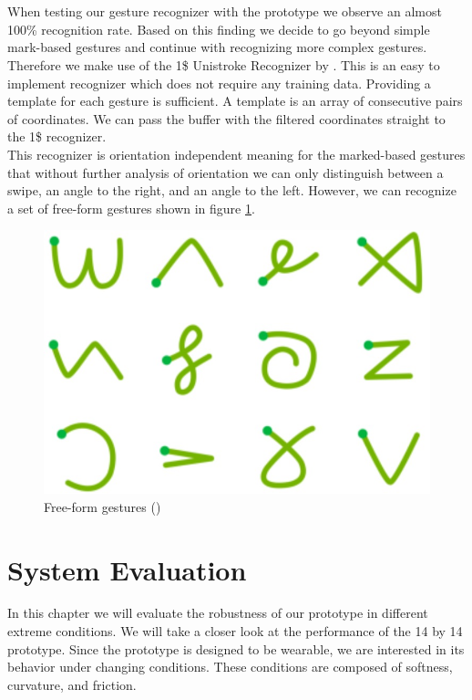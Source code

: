 \\ \\
When testing our gesture recognizer with the prototype we observe an almost 100\% recognition rate. Based on this finding we decide to go beyond simple mark-based gestures and continue with recognizing  more complex gestures. Therefore we make use of the 1\$ Unistroke Recognizer by \cite{Wobbrock}. This is an easy to implement recognizer which does not require any training data. Providing a template for each gesture is sufficient. A template is an array of consecutive pairs of coordinates. We can pass the buffer with the filtered coordinates straight to the 1\$ recognizer.
\\
This recognizer is orientation independent meaning for the marked-based gestures that without further analysis of orientation we can only distinguish between a swipe, an angle to the right, and an angle  to the left. However, we can recognize a set of free-form gestures shown in figure \ref{fig:freeFormGestures}.
\begin{figure}
\includegraphics[scale=0.3]{images/freeFormGestures.jpg}
\caption{Free-form gestures (\cite{Bragdon})}
\label{fig:freeFormGestures}
\end{figure}


\chapter{System Evaluation}
\label{evaluation}
In this chapter we will evaluate the robustness of our prototype in different extreme conditions. We will take a closer look at the performance of the 14 by 14 prototype. Since the prototype is designed to be wearable, we are interested in its behavior under changing conditions. These conditions are composed of softness, curvature, and friction.

